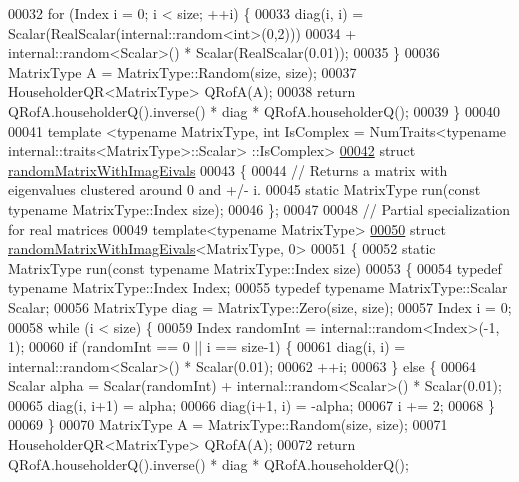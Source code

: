 \begin{DoxyCode}
00032   \textcolor{keywordflow}{for} (Index i = 0; i < size; ++i) \{
00033     diag(i, i) = Scalar(RealScalar(internal::random<int>(0,2)))
00034       + internal::random<Scalar>() * Scalar(RealScalar(0.01));
00035   \}
00036   MatrixType A = MatrixType::Random(size, size);
00037   HouseholderQR<MatrixType> QRofA(A);
00038   \textcolor{keywordflow}{return} QRofA.householderQ().inverse() * diag * QRofA.householderQ();
00039 \}
00040 
00041 template <typename MatrixType, int IsComplex = NumTraits<typename internal::traits<MatrixType>::Scalar>
      ::IsComplex>
\hyperlink{structrandom_matrix_with_imag_eivals}{00042} \textcolor{keyword}{struct }\hyperlink{structrandom_matrix_with_imag_eivals}{randomMatrixWithImagEivals}
00043 \{
00044   \textcolor{comment}{// Returns a matrix with eigenvalues clustered around 0 and +/- i.}
00045   \textcolor{keyword}{static} MatrixType run(\textcolor{keyword}{const} \textcolor{keyword}{typename} MatrixType::Index size);
00046 \};
00047 
00048 \textcolor{comment}{// Partial specialization for real matrices}
00049 \textcolor{keyword}{template}<\textcolor{keyword}{typename} MatrixType>
\hyperlink{structrandom_matrix_with_imag_eivals_3_01_matrix_type_00_010_01_4}{00050} \textcolor{keyword}{struct }\hyperlink{structrandom_matrix_with_imag_eivals}{randomMatrixWithImagEivals}<MatrixType, 0>
00051 \{
00052   \textcolor{keyword}{static} MatrixType run(\textcolor{keyword}{const} \textcolor{keyword}{typename} MatrixType::Index size)
00053   \{
00054     \textcolor{keyword}{typedef} \textcolor{keyword}{typename} MatrixType::Index Index;
00055     \textcolor{keyword}{typedef} \textcolor{keyword}{typename} MatrixType::Scalar Scalar;
00056     MatrixType diag = MatrixType::Zero(size, size);
00057     Index i = 0;
00058     \textcolor{keywordflow}{while} (i < size) \{
00059       Index randomInt = internal::random<Index>(-1, 1);
00060       \textcolor{keywordflow}{if} (randomInt == 0 || i == size-1) \{
00061         diag(i, i) = internal::random<Scalar>() * Scalar(0.01);
00062         ++i;
00063       \} \textcolor{keywordflow}{else} \{
00064         Scalar alpha = Scalar(randomInt) + internal::random<Scalar>() * Scalar(0.01);
00065         diag(i, i+1) = alpha;
00066         diag(i+1, i) = -alpha;
00067         i += 2;
00068       \}
00069     \}
00070     MatrixType A = MatrixType::Random(size, size);
00071     HouseholderQR<MatrixType> QRofA(A);
00072     \textcolor{keywordflow}{return} QRofA.householderQ().inverse() * diag * QRofA.householderQ();

\end{DoxyCode}
